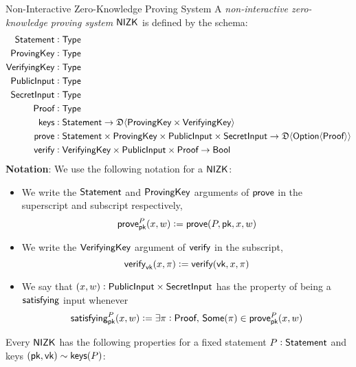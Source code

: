 \begin{definitiontoc}{Non-Interactive Zero-Knowledge Proving System}
    A \emph{non-interactive zero-knowledge proving system} ${\textsf{NIZK}}$ is defined by the schema:
    \begin{align*}
        {\textsf{Statement}}    &: {\textsf{Type}} \\
        {\textsf{ProvingKey}}   &: {\textsf{Type}} \\
        {\textsf{VerifyingKey}} &: {\textsf{Type}} \\
        {\textsf{PublicInput}}  &: {\textsf{Type}} \\
        {\textsf{SecretInput}}  &: {\textsf{Type}} \\
        {\textsf{Proof}}        &: {\textsf{Type}} \\
        {\textsf{keys}}         &: {\textsf{Statement}} \to \mathfrak{D}\langle{{\textsf{ProvingKey}}\times {\textsf{VerifyingKey}}}\rangle \\
        {\textsf{prove}}        &: {\textsf{Statement}} \times {\textsf{ProvingKey}} \times {\textsf{PublicInput}} \times {\textsf{SecretInput}} \to \mathfrak{D}\langle{{\textsf{Option}}\langle{{\textsf{Proof}}}\rangle}\rangle \\
        {\textsf{verify}}       &: {\textsf{VerifyingKey}} \times {\textsf{PublicInput}} \times {\textsf{Proof}} \to {\textsf{Bool}}
    \end{align*}
    \textbf{Notation}: We use the following notation for a ${\textsf{NIZK}}$:
    \begin{itemize}
        \item We write the ${\textsf{Statement}}$ and ${\textsf{ProvingKey}}$ arguments of ${\textsf{prove}}$ in the superscript and subscript respectively,
            \[{\textsf{prove}}^P_{\textsf{pk}}(x, w) := {\textsf{prove}}(P, {\textsf{pk}}, x, w)\]
        \item We write the ${\textsf{VerifyingKey}}$ argument of ${\textsf{verify}}$ in the subscript,
            \[{\textsf{verify}}_{\textsf{vk}}(x, \pi) := {\textsf{verify}}({\textsf{vk}}, x, \pi)\]
        \item We say that $(x, w) : {\textsf{PublicInput}} \times {\textsf{SecretInput}}$ has the property of being a ${\textsf{satisfying}}$ input whenever
            \[{\textsf{satisfying}}^P_{\textsf{pk}}(x, w) := \exists \pi : {\textsf{Proof}},\, {\textsf{Some}}(\pi) \in {\textsf{prove}}^P_{\textsf{pk}}(x, w)\]
    \end{itemize}

    Every ${\textsf{NIZK}}$ has the following properties for a fixed statement $P : {\textsf{Statement}}$ and keys $({\textsf{pk}}, {\textsf{vk}}) \sim {\textsf{keys}}(P)$:


\end{definitiontoc}
